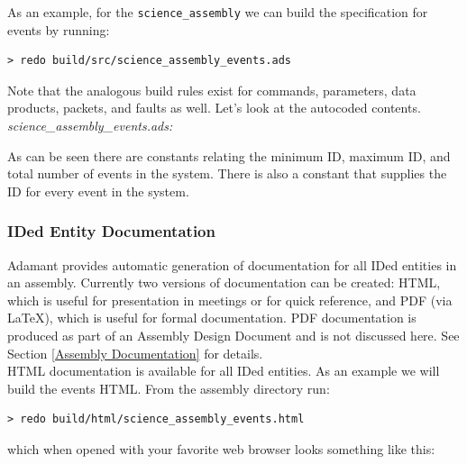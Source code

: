 As an example, for the \texttt{science\_assembly} we can build the specification for events by running:

\vspace{5mm} %
\begin{verbatim}
> redo build/src/science_assembly_events.ads
\end{verbatim}
\vspace{5mm} %

Note that the analogous build rules exist for commands, parameters, data products, packets, and faults as well. Let's look at the autocoded contents. \\

\textit{science\_assembly\_events.ads:}

As can be seen there are constants relating the minimum ID, maximum ID, and total number of events in the system. There is also a constant that supplies the ID for every event in the system.

\subsubsection{IDed Entity Documentation} \label{IDed Entity Documentation}

Adamant provides automatic generation of documentation for all IDed entities in an assembly. Currently two versions of documentation can be created: HTML, which is useful for presentation in meetings or for quick reference, and PDF (via \LaTeX), which is useful for formal documentation. PDF documentation is produced as part of an Assembly Design Document and is not discussed here. See Section \ref{Assembly Documentation} for details. \\

HTML documentation is available for all IDed entities. As an example we will build the events HTML. From the assembly directory run:

\vspace{5mm} %
\begin{verbatim}
> redo build/html/science_assembly_events.html
\end{verbatim}
\vspace{5mm} %

which when opened with your favorite web browser looks something like this: \\


